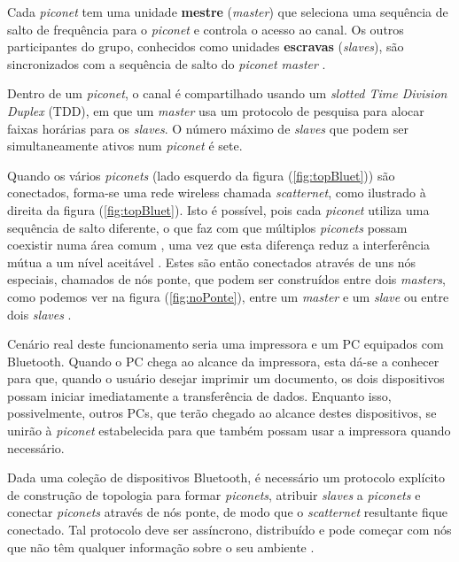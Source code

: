\documentclass[conference]{IEEEtran}
\begin{document}
Cada \textit{piconet} tem uma unidade \textbf{mestre} (\textit{master}) que seleciona uma sequência de salto de frequência para o \textit{piconet} e controla o acesso ao canal. 
Os outros participantes do grupo, conhecidos como unidades \textbf{escravas} (\textit{slaves}), são sincronizados com a sequência de salto do \textit{piconet master} \cite{salonidis2005distributed}. 

Dentro de um \textit{piconet}, o canal é compartilhado usando um \textit{slotted Time Division Duplex} (TDD), em que um \textit{master} usa um protocolo de pesquisa para alocar faixas horárias para os \textit{slaves}. O número máximo de \textit{slaves} que podem ser simultaneamente ativos num \textit{piconet} é sete.

Quando os vários \textit{piconets} (lado esquerdo da figura (\ref{fig:topBluet})) são conectados, forma-se uma rede wireless chamada \textit{scatternet}, como ilustrado à direita da figura (\ref{fig:topBluet}).
Isto é possível, pois cada \textit{piconet} utiliza uma sequência de salto diferente, o que faz com que múltiplos \textit{piconets} possam coexistir numa área comum \cite{salonidis2005distributed}, uma vez que esta diferença reduz a interferência mútua a um nível aceitável \cite{prasad2004ofdm}. 
Estes são então conectados através de uns nós especiais, chamados de nós ponte, que podem ser construídos entre dois \textit{masters}, como podemos ver na figura (\ref{fig:noPonte}), entre um \textit{master} e um \textit{slave} ou entre dois \textit{slaves} \cite{salonidis2005distributed}.

Cenário real deste funcionamento seria uma impressora e um PC equipados com Bluetooth. Quando o PC chega ao alcance da impressora, esta dá-se a conhecer para que, quando o usuário desejar imprimir um documento, os dois dispositivos possam iniciar imediatamente a transferência de dados. Enquanto isso, possivelmente, outros PCs, que terão chegado ao alcance destes dispositivos, se unirão à \textit{piconet} estabelecida para que também possam usar a impressora quando necessário.

Dada uma coleção de dispositivos Bluetooth, é necessário um protocolo explícito de construção de topologia para formar \textit{piconets}, atribuir \textit{slaves} a \textit{piconets} e conectar \textit{piconets} através de nós ponte, de modo que o \textit{scatternet} resultante fique conectado. Tal protocolo deve ser assíncrono, distribuído e pode começar com nós que não têm qualquer informação sobre o seu ambiente \cite{salonidis2005distributed}.
\end{document}
